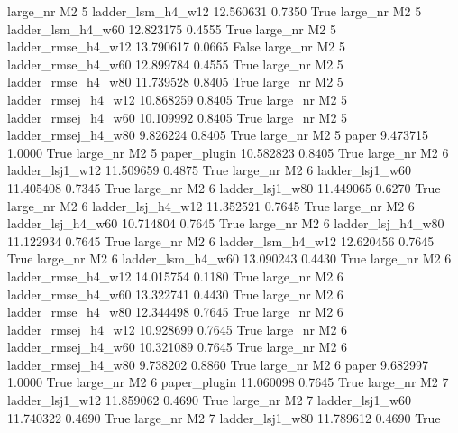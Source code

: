   large_nr       M2                 5   ladder_lsm_h4_w12   12.560631      0.7350    True
  large_nr       M2                 5   ladder_lsm_h4_w60   12.823175      0.4555    True
  large_nr       M2                 5  ladder_rmse_h4_w12   13.790617      0.0665   False
  large_nr       M2                 5  ladder_rmse_h4_w60   12.899784      0.4555    True
  large_nr       M2                 5  ladder_rmse_h4_w80   11.739528      0.8405    True
  large_nr       M2                 5 ladder_rmsej_h4_w12   10.868259      0.8405    True
  large_nr       M2                 5 ladder_rmsej_h4_w60   10.109992      0.8405    True
  large_nr       M2                 5 ladder_rmsej_h4_w80    9.826224      0.8405    True
  large_nr       M2                 5               paper    9.473715      1.0000    True
  large_nr       M2                 5        paper_plugin   10.582823      0.8405    True
  large_nr       M2                 6     ladder_lsj1_w12   11.509659      0.4875    True
  large_nr       M2                 6     ladder_lsj1_w60   11.405408      0.7345    True
  large_nr       M2                 6     ladder_lsj1_w80   11.449065      0.6270    True
  large_nr       M2                 6   ladder_lsj_h4_w12   11.352521      0.7645    True
  large_nr       M2                 6   ladder_lsj_h4_w60   10.714804      0.7645    True
  large_nr       M2                 6   ladder_lsj_h4_w80   11.122934      0.7645    True
  large_nr       M2                 6   ladder_lsm_h4_w12   12.620456      0.7645    True
  large_nr       M2                 6   ladder_lsm_h4_w60   13.090243      0.4430    True
  large_nr       M2                 6  ladder_rmse_h4_w12   14.015754      0.1180    True
  large_nr       M2                 6  ladder_rmse_h4_w60   13.322741      0.4430    True
  large_nr       M2                 6  ladder_rmse_h4_w80   12.344498      0.7645    True
  large_nr       M2                 6 ladder_rmsej_h4_w12   10.928699      0.7645    True
  large_nr       M2                 6 ladder_rmsej_h4_w60   10.321089      0.7645    True
  large_nr       M2                 6 ladder_rmsej_h4_w80    9.738202      0.8860    True
  large_nr       M2                 6               paper    9.682997      1.0000    True
  large_nr       M2                 6        paper_plugin   11.060098      0.7645    True
  large_nr       M2                 7     ladder_lsj1_w12   11.859062      0.4690    True
  large_nr       M2                 7     ladder_lsj1_w60   11.740322      0.4690    True
  large_nr       M2                 7     ladder_lsj1_w80   11.789612      0.4690    True
